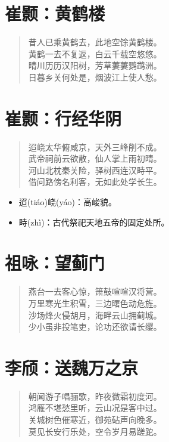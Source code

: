 \documentclass[12pt,oneside]{book}
\newenvironment{shici}{%
\begin{verse}\centering\yanti\large\hspace{12pt}}{\end{verse}}
\begin{document}
\begin{common-format}
\chapter{崔颢：黄鹤楼}
\begin{shici}
昔人已乘黄鹤去，此地空馀黄鹤楼。\\
黄鹤一去不复返，白云千载空悠悠。\\
晴川历历汉阳树，芳草萋萋鹦鹉洲。\\
日暮乡关何处是，烟波江上使人愁。
\end{shici}

\chapter{崔颢：行经华阴}
\begin{shici}
迢峣太华俯咸京，天外三峰削不成。\\
武帝祠前云欲散，仙人掌上雨初晴。\\
河山北枕秦关险，驿树西连汉畤平。\\
借问路傍名利客，无如此处学长生。
\end{shici}

\begin{itemize}
\item 迢(tiáo)峣(yáo)：高峻貌。
\item 畤(zhì)：古代祭祀天地五帝的固定处所。
\end{itemize}

\chapter{祖咏：望蓟门}
\begin{shici}
燕台一去客心惊，箫鼓喧喧汉将营。\\
万里寒光生积雪，三边曙色动危旌。\\
沙场烽火侵胡月，海畔云山拥蓟城。\\
少小虽非投笔吏，论功还欲请长缨。
\end{shici}

\chapter{李颀：送魏万之京}
\begin{shici}
朝闻游子唱骊歌，昨夜微霜初度河。\\
鸿雁不堪愁里听，云山况是客中过。\\
关城树色催寒近，御苑砧声向晚多。\\
莫见长安行乐处，空令岁月易蹉跎。
\end{shici}


\end{common-format}
\end{document}
